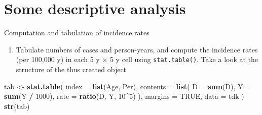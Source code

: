 \documentclass[
]{book}
\newenvironment{Shaded}{\begin{snugshade}}{\end{snugshade}}
\newcommand{\AttributeTok}[1]{\textcolor[rgb]{0.13,0.29,0.53}{#1}}
\newcommand{\ConstantTok}[1]{\textcolor[rgb]{0.56,0.35,0.01}{#1}}
\newcommand{\DecValTok}[1]{\textcolor[rgb]{0.00,0.00,0.81}{#1}}
\newcommand{\FunctionTok}[1]{\textcolor[rgb]{0.13,0.29,0.53}{\textbf{#1}}}
\newcommand{\NormalTok}[1]{#1}
\newcommand{\OtherTok}[1]{\textcolor[rgb]{0.56,0.35,0.01}{#1}}
\newcommand{\SpecialCharTok}[1]{\textcolor[rgb]{0.81,0.36,0.00}{\textbf{#1}}}
\providecommand{\tightlist}{%
  \setlength{\itemsep}{0pt}\setlength{\parskip}{0pt}}
\begin{document}
\begin{Shaded}
\end{Shaded}

\section{Some descriptive analysis}\label{some-descriptive-analysis}

Computation and tabulation of incidence rates

\begin{enumerate}
\def\labelenumi{\arabic{enumi}.}
\tightlist
\item
  Tabulate numbers of cases and person-years, and compute the
  incidence rates (per 100,000 y) in each 5 y \(\times\) 5 y cell using
  \texttt{stat.table()}. Take a look at the structure of the thus created object
\end{enumerate}

\begin{Shaded}
\begin{Highlighting}[]
\NormalTok{tab }\OtherTok{\textless{}{-}} \FunctionTok{stat.table}\NormalTok{(}
  \AttributeTok{index =} \FunctionTok{list}\NormalTok{(Age, Per),}
  \AttributeTok{contents =} \FunctionTok{list}\NormalTok{(}
    \AttributeTok{D =} \FunctionTok{sum}\NormalTok{(D),}
    \AttributeTok{Y =} \FunctionTok{sum}\NormalTok{(Y }\SpecialCharTok{/} \DecValTok{1000}\NormalTok{),}
    \AttributeTok{rate =} \FunctionTok{ratio}\NormalTok{(D, Y, }\DecValTok{10}\SpecialCharTok{\^{}}\DecValTok{5}\NormalTok{)}
\NormalTok{  ),}
  \AttributeTok{margins =} \ConstantTok{TRUE}\NormalTok{,}
  \AttributeTok{data =}\NormalTok{ tdk}
\NormalTok{)}
\FunctionTok{str}\NormalTok{(tab)}
\end{Highlighting}
\end{Shaded}
\end{document}
